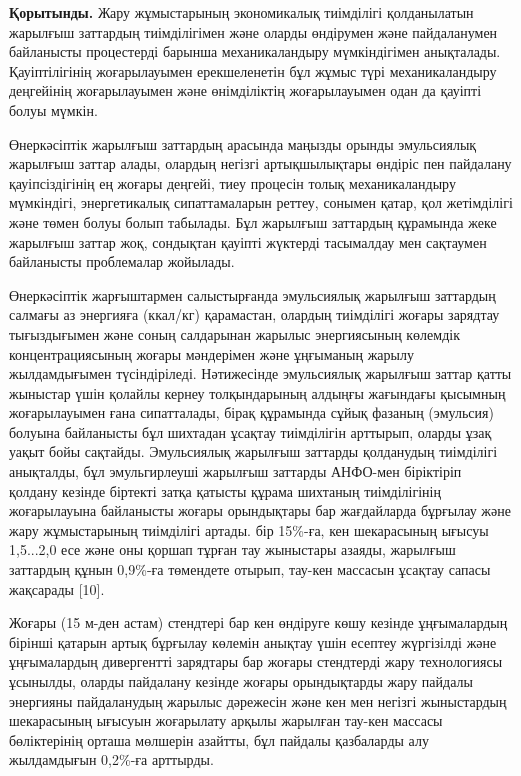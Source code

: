 \begin{multicols}{2}
{\bfseries Қорытынды.} Жару жұмыстарының экономикалық тиімділігі
қолданылатын жарылғыш заттардың тиімділігімен және оларды өндірумен және
пайдаланумен байланысты процестерді барынша механикаландыру
мүмкіндігімен анықталады. Қауіптілігінің жоғарылауымен ерекшеленетін бұл
жұмыс түрі механикаландыру деңгейінің жоғарылауымен және өнімділіктің
жоғарылауымен одан да қауіпті болуы мүмкін.

Өнеркәсіптік жарылғыш заттардың арасында маңызды орынды эмульсиялық
жарылғыш заттар алады, олардың негізгі артықшылықтары өндіріс пен
пайдалану қауіпсіздігінің ең жоғары деңгейі, тиеу процесін толық
механикаландыру мүмкіндігі, энергетикалық сипаттамаларын реттеу, сонымен
қатар, қол жетімділігі және төмен болуы болып табылады. Бұл жарылғыш
заттардың құрамында жеке жарылғыш заттар жоқ, сондықтан қауіпті жүктерді
тасымалдау мен сақтаумен байланысты проблемалар жойылады.

Өнеркәсіптік жарғыштармен салыстырғанда эмульсиялық жарылғыш заттардың
салмағы аз энергияға (ккал/кг) қарамастан, олардың тиімділігі жоғары
зарядтау тығыздығымен және соның салдарынан жарылыс энергиясының
көлемдік концентрациясының жоғары мәндерімен және ұңғыманың жарылу
жылдамдығымен түсіндіріледі. Нәтижесінде эмульсиялық жарылғыш заттар
қатты жыныстар үшін қолайлы кернеу толқындарының алдыңғы жағындағы
қысымның жоғарылауымен ғана сипатталады, бірақ құрамында сұйық фазаның
(эмульсия) болуына байланысты бұл шихтадан ұсақтау тиімділігін арттырып,
оларды ұзақ уақыт бойы сақтайды. Эмульсиялық жарылғыш заттарды
қолданудың тиімділігі анықталды, бұл эмульгирлеуші
\hspace{0pt}\hspace{0pt}жарылғыш заттарды АНФО-мен біріктіріп қолдану
кезінде біртекті затқа қатысты құрама шихтаның тиімділігінің
жоғарылауына байланысты жоғары орындықтары бар жағдайларда бұрғылау және
жару жұмыстарының тиімділігі артады. бір 15\%-ға, кен шекарасының ығысуы
1,5...2,0 есе және оны қоршап тұрған тау жыныстары азаяды, жарылғыш
заттардың құнын 0,9\%-ға төмендете отырып, тау-кен массасын ұсақтау
сапасы жақсарады {[}10{]}.

Жоғары (15 м-ден астам) стендтері бар кен өндіруге көшу кезінде
ұңғымалардың бірінші қатарын артық бұрғылау көлемін анықтау үшін есептеу
жүргізілді және ұңғымалардың дивергентті зарядтары бар жоғары стендтерді
жару технологиясы ұсынылды, оларды пайдалану кезінде жоғары орындықтарды
жару пайдалы энергияны пайдаланудың жарылыс дәрежесін және кен мен
негізгі жыныстардың шекарасының ығысуын жоғарылату арқылы жарылған
тау-кен массасы бөліктерінің орташа мөлшерін азайтты, бұл пайдалы
қазбаларды алу жылдамдығын 0,2\%-ға арттырды.


\end{multicols}
